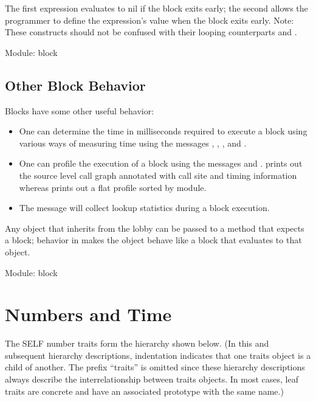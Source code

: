\documentclass[letterpaper,10pt,english]{sphinxmanual}
\begin{document}
The first expression evaluates to nil if the block exits early; the second allows the programmer to
define the expression’s value when the block exits early. Note: These constructs should not be confused
with their looping counterparts  and .

Module: block


\subsection{Other Block Behavior}
\label{\detokenize{blocks:other-block-behavior}}
Blocks have some other useful behavior:
\begin{itemize}
\item {} 
One can determine the time in milliseconds required to execute a block using various ways of measuring time using the messages , , , and .

\item {} 
One can profile the execution of a block using the messages  and .  prints out the source level call graph annotated with call site and timing information   whereas  prints out a flat profile sorted by module.

\item {} 
The message  will collect lookup statistics during a block execution.

\end{itemize}

Any object that inherits from the lobby can be passed to a method that expects a block; behavior in  makes the object behave like a block that evaluates to that object.

Module: block


\section{Numbers and Time}
\label{\detokenize{numbers:numbers-and-time}}\label{\detokenize{numbers::doc}}
The SELF number traits form the hierarchy shown below. (In this and subsequent hierarchy descriptions,
indentation indicates that one traits object is a child of another. The prefix “traits” is
omitted since these hierarchy descriptions always describe the interrelationship between traits objects.
In most cases, leaf traits are concrete and have an associated prototype with the same name.)
\end{document}
